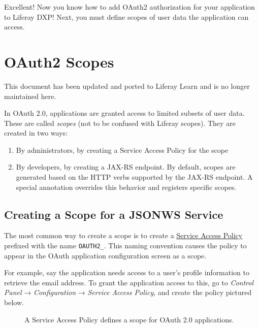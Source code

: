 Excellent! Now you know how to add OAuth2 authorization for your
application to Liferay DXP! Next, you must define scopes of user data
the application can access.

\chapter{OAuth2 Scopes}\label{oauth2-scopes}

{This document has been updated and ported to Liferay Learn and is no
longer maintained here.}

In OAuth 2.0, applications are granted access to limited subsets of user
data. These are called \emph{scopes} (not to be confused with Liferay
scopes). They are created in two ways:

\begin{enumerate}
\def\labelenumi{\arabic{enumi}.}
\item
  By administrators, by creating a Service Access Policy for the scope
\item
  By developers, by creating a JAX-RS endpoint. By default, scopes are
  generated based on the HTTP verbs supported by the JAX-RS endpoint. A
  special annotation overrides this behavior and registers specific
  scopes.
\end{enumerate}

\section{Creating a Scope for a JSONWS
Service}\label{creating-a-scope-for-a-jsonws-service}

The most common way to create a scope is to create a
\href{/docs/7-2/deploy/-/knowledge_base/d/service-access-policies}{Service
Access Policy} prefixed with the name \texttt{OAUTH2\_}. This naming
convention causes the policy to appear in the OAuth application
configuration screen as a scope.

For example, say the application needs access to a user's profile
information to retrieve the email address. To grant the application
access to this, go to \emph{Control Panel} → \emph{Configuration} →
\emph{Service Access Policy}, and create the policy pictured below.

\begin{figure}
\centering
{}
\caption{A Service Access Policy defines a scope for OAuth 2.0
applications.}
\end{figure}

